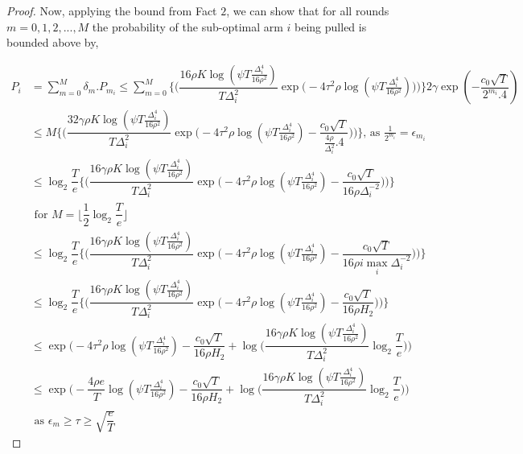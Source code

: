 \begin{proof}
Now, applying the bound from Fact $2$, we can show that for all rounds $m=0,1,2,...,M$ the probability of the sub-optimal arm $i$ being pulled is bounded above by,

\begin{align*}
P_{i} &= \sum_{m=0}^{M} \delta_{m}.P_{m_{i}} \leq \sum_{m=0}^{M} \bigg\lbrace \bigg(\dfrac{16\rho K\log (\psi T \frac{\Delta_{i}^{4}}{16\rho^{2}})}{T\Delta_{i}^{2}}\exp\big(-4\tau^{2}\rho\log (\psi T\frac{\Delta_{i}^{4}}{16\rho^{2}})\big)\bigg) \bigg\rbrace2\gamma \exp(-\dfrac{c_{0}\sqrt{T}}{2^{m_{i}}.4})\\
& \leq M \bigg\lbrace \bigg(\dfrac{32\gamma\rho K\log (\psi T \frac{\Delta_{i}^{4}}{16\rho^{2}})}{T\Delta_{i}^{2}}\exp\big(-4\tau^{2}\rho\log (\psi T\frac{\Delta_{i}^{4}}{16\rho^{2}})-\dfrac{c_{0}\sqrt{T}}{\frac{4\rho}{\Delta_{i}^{2}}.4}\big)\bigg) \bigg\rbrace \text{, as $\frac{1}{2^{m_{i}}}=\epsilon_{m_{i}}$}\\
& \leq \log_{2}\dfrac{T}{e}\bigg\lbrace \bigg(\dfrac{16\gamma\rho K\log (\psi T \frac{\Delta_{i}^{4}}{16\rho^{2}})}{T\Delta_{i}^{2}}\exp\big(-4\tau^{2}\rho\log (\psi T\frac{\Delta_{i}^{4}}{16\rho^{2}})-\dfrac{c_{0}\sqrt{T}}{16\rho\Delta_{i}^{-2}}\big)\bigg) \bigg\rbrace\\
&\text{ for $M=\big \lfloor \dfrac{1}{2}\log_{2} \dfrac{T}{e}\big\rfloor$}\\
& \leq \log_{2}\dfrac{T}{e}\bigg\lbrace \bigg(\dfrac{16\gamma\rho K\log (\psi T \frac{\Delta_{i}^{4}}{16\rho^{2}})}{T\Delta_{i}^{2}}\exp\big(-4\tau^{2}\rho\log (\psi T\frac{\Delta_{i}^{4}}{16\rho^{2}})-\dfrac{c_{0}\sqrt{T}}{16\rho i\max_{i}\Delta_{i}^{-2}}\big)\bigg) \bigg\rbrace\\
& \leq \log_{2}\dfrac{T}{e}\bigg\lbrace \bigg(\dfrac{16\gamma\rho K\log (\psi T \frac{\Delta_{i}^{4}}{16\rho^{2}})}{T\Delta_{i}^{2}}\exp\big(-4\tau^{2}\rho\log (\psi T\frac{\Delta_{i}^{4}}{16\rho^{2}})-\dfrac{c_{0}\sqrt{T}}{16\rho H_{2}}\big)\bigg) \bigg\rbrace\\
& \leq \exp\bigg(-4\tau^{2}\rho\log (\psi T\frac{\Delta_{i}^{4}}{16\rho^{2}})-\dfrac{c_{0}\sqrt{T}}{16\rho H_{2}} + \log \big( \dfrac{16\gamma\rho K\log (\psi T \frac{\Delta_{i}^{4}}{16\rho^{2}})}{T\Delta_{i}^{2}}\log_{2}\dfrac{T}{e} \big) \bigg)\\
&  \leq \exp\bigg(-\dfrac{4\rho e}{T}\log (\psi T\frac{\Delta_{i}^{4}}{16\rho^{2}})-\dfrac{c_{0}\sqrt{T}}{16\rho H_{2}} + \log \big( \dfrac{16\gamma\rho K\log (\psi T \frac{\Delta_{i}^{4}}{16\rho^{2}})}{T\Delta_{i}^{2}}\log_{2}\dfrac{T}{e} \big) \bigg)\\
& \text{ as $\epsilon_{m}\geq\tau\geq\sqrt{\dfrac{e}{T}}$}
\end{align*}


\end{proof}
